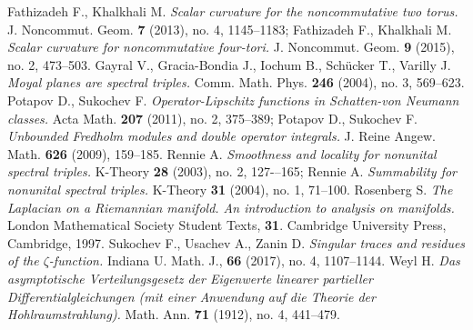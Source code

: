 \documentclass{article}
\begin{document}
\begin{thebibliography}{99}
 Fathizadeh F., Khalkhali M. {\it Scalar curvature for the noncommutative two torus.} J. Noncommut. Geom. {\bf 7} (2013), no. 4, 1145--1183; Fathizadeh F., Khalkhali M. {\it Scalar curvature for noncommutative four-tori.} J. Noncommut. Geom. {\bf 9} (2015), no. 2, 473--503.
 Gayral V., Gracia-Bondia J., Iochum B., Sch\"ucker T., Varilly J. {\it Moyal planes are spectral triples.} Comm. Math. Phys. {\bf 246} (2004), no. 3, 569--623.
 Potapov D., Sukochev F. {\it Operator-Lipschitz functions in Schatten-von Neumann classes.} Acta Math. {\bf 207} (2011), no. 2, 375--389; Potapov D., Sukochev F. {\it Unbounded Fredholm modules and double operator integrals.} J. Reine Angew. Math. {\bf 626} (2009), 159--185.
 Rennie A. {\it Smoothness and locality for nonunital spectral triples.} K-Theory {\bf 28} (2003), no. 2, 127-–165; Rennie A. {\it Summability for nonunital spectral triples. } K-Theory {\bf 31} (2004), no. 1, 71--100.
 Rosenberg S. {\it The Laplacian on a Riemannian manifold. An introduction to analysis on manifolds.} London Mathematical Society Student Texts, {\bf 31}. Cambridge University Press, Cambridge, 1997.
 Sukochev F., Usachev A., Zanin D. {\it Singular traces and residues of the $\zeta$-function.} Indiana U. Math. J., {\bf 66} (2017), no. 4, 1107--1144.
 Weyl H. {\it Das asymptotische Verteilungsgesetz der Eigenwerte linearer partieller Differentialgleichungen (mit einer Anwendung auf die Theorie der Hohlraumstrahlung).} Math. Ann. {\bf 71} (1912), no. 4, 441--479. 


\end{thebibliography}
\end{document}
